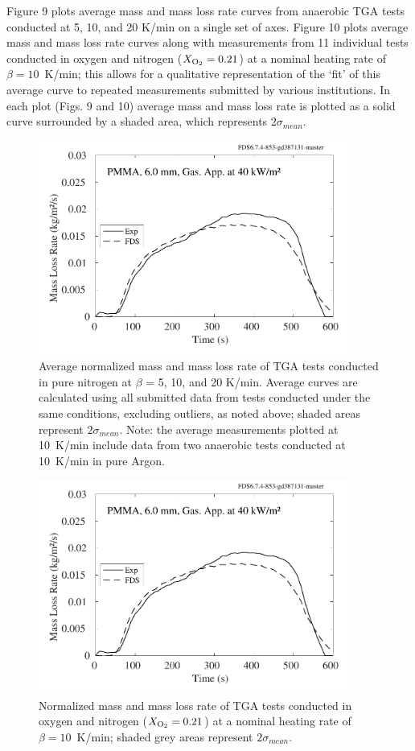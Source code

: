\documentclass{book}
\begin{document}
Figure 9 plots average mass and mass loss rate curves from anaerobic TGA tests conducted at 5, 10, and 20 K/min on a single set of axes. Figure 10 plots average mass and mass loss rate curves along with measurements from 11 individual tests conducted in oxygen and nitrogen ($X_{\rm O_2}=0.21$) at a nominal heating rate of $\beta=10$~K/min; this allows for a qualitative representation of the ‘fit’ of this average curve to repeated measurements submitted by various institutions. In each plot (Figs. 9 and 10) average mass and mass loss rate is plotted as a solid curve surrounded by a shaded area, which represents $2\sigma_{mean}$.

\begin{figure}
  \centering
  \includegraphics[width=4in]{SCRIPT_FIGURES/PMMA_40}
  \caption{Average normalized mass and mass loss rate of TGA tests conducted in pure nitrogen at $\beta$ = 5, 10, and 20 K/min. Average curves are calculated using all submitted data from tests conducted under the same conditions, excluding outliers, as noted above; shaded areas represent $2\sigma_{mean}$. Note: the average measurements plotted at 10~K/min include data from two anaerobic tests conducted at 10~K/min in pure Argon.}
  \label{Fig_9}
\end{figure}

\begin{figure}
  \centering
  \includegraphics[width=4in]{SCRIPT_FIGURES/PMMA_40}
  \caption{Normalized mass and mass loss rate of TGA tests conducted in oxygen and nitrogen ($X_{\rm O_2}=0.21$) at a nominal heating rate of $\beta=10$~K/min; shaded grey areas represent $2\sigma_{mean}$.}
  \label{Fig_10}
\end{figure}
\end{document}
